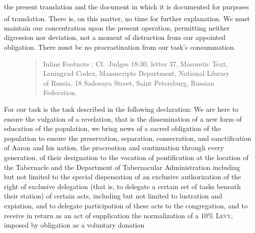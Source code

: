 {{{{{                        the present translation and the document in which it is documented
                        for purposes of translation.
                        There is, on this matter, no time for further explanation.\textsuperscript{}
					   We must maintain our concentration upon the present operation,
                        permitting neither digression nor deviation, not a moment of
                        distraction from our appointed obligation.
                        There must be no procrastination from our task's consummation.
						\begin{figure}
						\begin{quote}
						\vspace{-0.5\baselineskip}
						\scriptsize
						Inline Footnote :
						Cf.\ Judges 18:30, letter 37,
						Masoretic Text,
						Leningrad Codex,
						Manuscripts Department,
						National Library of Russia,
						18 Sadovaya Street,
						Saint Petersburg,
						Russian Federation.
						\vspace{-0.5\baselineskip}
						\end{quote}
						\end{figure}
                        For our task is the task described in the following declaration:
                        We are here to ensure the vulgation of a revelation, that is
                        the dissemination of a new form of education of the population,
                        we bring news of a sacred obligation of the population to ensure
                        the preservation, separation, consecration, and sanctification of
                        Aaron and his nation, the procreation and continuation through
                        every generation, of their designation to the vocation of pontification
                        at the location of the Tabernacle and the Department of Tabernacular Administration
                        including but not limited to the special dispensation of an exclusive
                        authorization of the right of exclusive delegation (that is, to delegate
                        a certain set of tasks beneath their station) of certain acts,
                        including but not limited to lustration and expiation,
                        and to delegate participation of these acts to the congregation,
                        and to receive in return as an act of supplication
                        the normalization of a 10\% \textsc{Levy},
                        imposed by obligation as a voluntary donation
}}}}}
